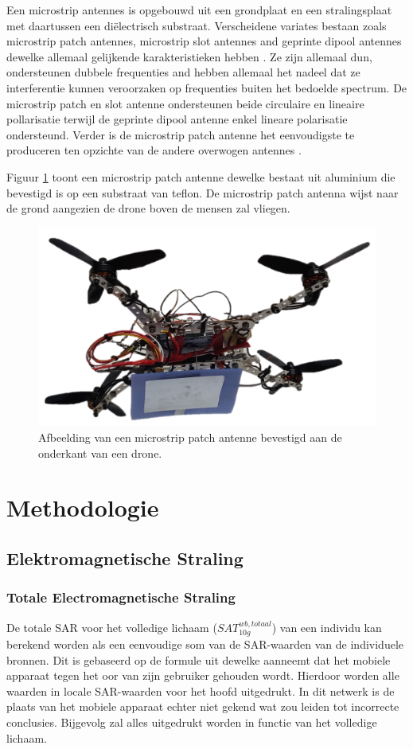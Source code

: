 \documentclass[twocolumn]{phdsymp_dutch}
\begin{document}
Een microstrip antennes is opgebouwd uit een grondplaat en een stralingsplaat met daartussen een di\"electrisch substraat.
Verscheidene variates bestaan zoals microstrip patch antennes, microstrip slot antennes and geprinte dipool antennes 
dewelke allemaal gelijkende karakteristieken hebben \cite{J13_microstripadvantages,J14_antennadesign}. 
Ze zijn allemaal dun, ondersteunen dubbele frequenties and hebben allemaal het nadeel dat 
ze interferentie kunnen veroorzaken op frequenties buiten het bedoelde spectrum. 
De microstrip patch en slot antenne ondersteunen beide circulaire en lineaire pollarisatie terwijl de geprinte dipool antenne enkel 
lineare polarisatie ondersteund. Verder is de microstrip patch antenne het eenvoudigste te produceren ten opzichte 
van de andere overwogen antennes \cite{J13_microstripadvantages}. 

Figuur \ref{fig:exampleDrone} toont een microstrip patch antenne dewelke bestaat 
uit aluminium die bevestigd is op een substraat van teflon. De microstrip patch antenna 
wijst naar de grond aangezien de drone boven de mensen zal vliegen.

\begin{figure}[h]
\centering
  \includegraphics[width=0.5\linewidth]{drone.png}
  \caption{Afbeelding van een microstrip patch antenne bevestigd aan de onderkant van een drone. }
  \label{fig:exampleDrone}
\end{figure}

\section{Methodologie}
\subsection{Elektromagnetische Straling}
\subsubsection{Totale Electromagnetische Straling}
De totale \gls{SAR} voor het volledige lichaam ($SAT^{wb,totaal}_{10g}$) van een individu 
kan berekend worden als een eenvoudige som van de \gls{SAR}-waarden van de individuele bronnen. 
Dit is gebaseerd op de formule uit \cite{J17_kuehn2019modelling} dewelke aanneemt dat het mobiele apparaat 
tegen het oor van zijn gebruiker gehouden wordt. Hierdoor worden alle waarden in locale \gls{SAR}-waarden voor het hoofd uitgedrukt.
In dit netwerk is de plaats van het mobiele apparaat echter  niet  gekend wat zou leiden tot incorrecte conclusies. Bijgevolg 
zal alles uitgedrukt worden in functie van het volledige lichaam.
\end{document}
